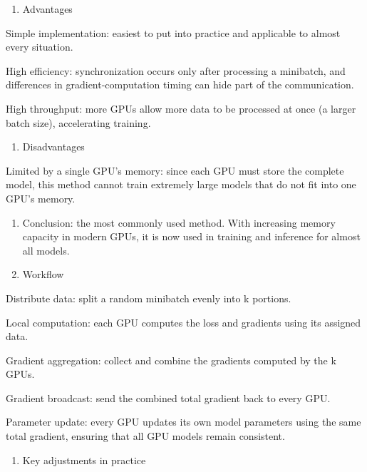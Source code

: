 \begin{enumerate}
\def\labelenumi{(\arabic{enumi})}
\setcounter{enumi}{1}
\tightlist
\item
  Advantages
\end{enumerate}

Simple implementation: easiest to put into practice and applicable to almost every situation.

High efficiency: synchronization occurs only after processing a minibatch, and differences in gradient-computation timing can hide part of the communication.

High throughput: more GPUs allow more data to be processed at once (a larger batch size), accelerating training.

\begin{enumerate}
\def\labelenumi{(\arabic{enumi})}
\setcounter{enumi}{2}
\tightlist
\item
  Disadvantages
\end{enumerate}

Limited by a single GPU's memory: since each GPU must store the complete model, this method cannot train extremely large models that do not fit into one GPU's memory.

\begin{enumerate}
\def\labelenumi{(\arabic{enumi})}
\setcounter{enumi}{3}
\item
  Conclusion: the most commonly used method. With increasing memory capacity in modern GPUs, it is now used in training and inference for almost all models.
\item
  Workflow
\end{enumerate}

Distribute data: split a random minibatch evenly into k portions.

Local computation: each GPU computes the loss and gradients using its assigned data.

Gradient aggregation: collect and combine the gradients computed by the k GPUs.

Gradient broadcast: send the combined total gradient back to every GPU.

Parameter update: every GPU updates its own model parameters using the same total gradient, ensuring that all GPU models remain consistent.

\begin{enumerate}
\def\labelenumi{(\arabic{enumi})}
\setcounter{enumi}{5}
\tightlist
\item
  Key adjustments in practice
\end{enumerate}

